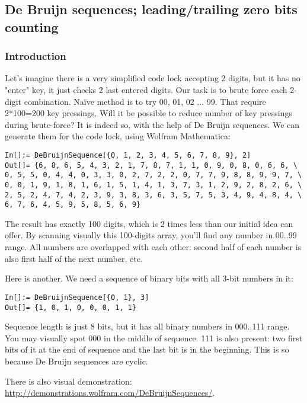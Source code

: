 \subsection{De Bruijn sequences; leading/trailing zero bits counting}
\label{DeBruijn}

\subsubsection{Introduction}

Let's imagine there is a very simplified code lock accepting 2 digits, but it has no "enter" key, it just checks 2 last entered digits.
Our task is to brute force each 2-digit combination.
Naïve method is to try 00, 01, 02 ... 99.
That require 2*100=200 key pressings.
Will it be possible to reduce number of key pressings during brute-force?
It is indeed so, with the help of De Bruijn sequences.
We can generate them for the code lock, using Wolfram Mathematica:

\begin{lstlisting}
In[]:= DeBruijnSequence[{0, 1, 2, 3, 4, 5, 6, 7, 8, 9}, 2]
Out[]= {6, 8, 6, 5, 4, 3, 2, 1, 7, 8, 7, 1, 1, 0, 9, 0, 8, 0, 6, 6, \
0, 5, 5, 0, 4, 4, 0, 3, 3, 0, 2, 7, 2, 2, 0, 7, 7, 9, 8, 8, 9, 9, 7, \
0, 0, 1, 9, 1, 8, 1, 6, 1, 5, 1, 4, 1, 3, 7, 3, 1, 2, 9, 2, 8, 2, 6, \
2, 5, 2, 4, 7, 4, 2, 3, 9, 3, 8, 3, 6, 3, 5, 7, 5, 3, 4, 9, 4, 8, 4, \
6, 7, 6, 4, 5, 9, 5, 8, 5, 6, 9}
\end{lstlisting}

The result has exactly 100 digits, which is 2 times less than our initial idea can offer.
By scanning visually this 100-digits array, you'll find any number in 00..99 range.
All numbers are overlapped with each other: second half of each number is also first half of the next number, etc.

Here is another. We need a sequence of binary bits with all 3-bit numbers in it:

\begin{lstlisting}
In[]:= DeBruijnSequence[{0, 1}, 3]
Out[]= {1, 0, 1, 0, 0, 0, 1, 1}
\end{lstlisting}

Sequence length is just 8 bits, but it has all binary numbers in 000..111 range.
You may visually spot 000 in the middle of sequence.
111 is also present: two first bits of it at the end of sequence and the last bit is in the beginning.
This is so because De Bruijn sequences are cyclic.

There is also visual demonstration: \url{http://demonstrations.wolfram.com/DeBruijnSequences/}.

